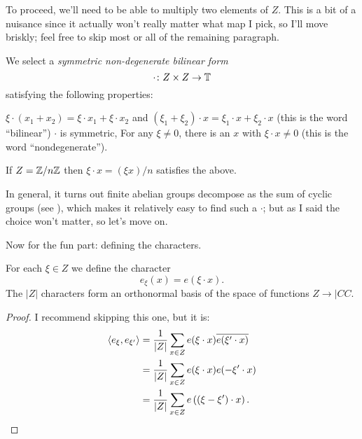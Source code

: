 To proceed, we'll need to be able to multiply two elements of $Z$.
This is a bit of a nuisance since it actually won't really
matter what map I pick, so I'll move briskly;
feel free to skip most or all of the remaining paragraph.
\begin{definition}
We select a \emph{symmetric non-degenerate bilinear form}
\[ \cdot \colon Z \times Z \to \mathbb T \]
satisfying the following properties:
\begin{itemize}
	\ii $\xi \cdot (x_1 + x_2) = \xi \cdot x_1 + \xi \cdot x_2$
	and $(\xi_1 + \xi_2) \cdot x = \xi_1 \cdot x + \xi_2 \cdot x$
	(this is the word ``bilinear'')
	\ii $\cdot$ is symmetric,
	\ii For any $\xi \neq 0$, there is an $x$ with $\xi \cdot x \neq 0$
	(this is the word ``nondegenerate'').
\end{itemize}
\end{definition}
\begin{example}
	If $Z = \mathbb Z/n\mathbb Z$ then $\xi \cdot x = (\xi x)/n$ satisfies the above.
\end{example}
In general, it turns out finite abelian groups
decompose as the sum of cyclic groups (see ),
which makes it relatively easy to find such a $\cdot$;
but as I said the choice won't matter, so let's move on.

Now for the fun part: defining the characters.
\begin{proposition}
	For each $\xi \in Z$ we define the character
	\[ e_\xi(x) = e(\xi \cdot x). \]
	The $|Z|$ characters form an orthonormal basis of the
	space of functions $Z \to |CC$.
\end{proposition}
\begin{proof}
	I recommend skipping this one, but it is:
	\begin{align*}
		\left< e_{\xi}, e_{\xi'} \right>
		&= \frac{1}{|Z|} \sum_{x \in Z} e(\xi \cdot x) \overline{e(\xi' \cdot x)} \\
		&= \frac{1}{|Z|} \sum_{x \in Z} e(\xi \cdot x) e(-\xi' \cdot x) \\
		&= \frac{1}{|Z|} \sum_{x \in Z} e\left( (\xi-\xi') \cdot x \right).
	\end{align*}
\end{proof}

